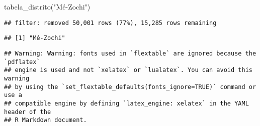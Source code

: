 \documentclass[
]{article}
\newenvironment{Shaded}{\begin{snugshade}}{\end{snugshade}}
\newcommand{\FunctionTok}[1]{\textcolor[rgb]{0.00,0.00,0.00}{#1}}
\newcommand{\NormalTok}[1]{#1}
\newcommand{\StringTok}[1]{\textcolor[rgb]{0.31,0.60,0.02}{#1}}
\begin{document}
\begin{Shaded}
\begin{Highlighting}[]
\FunctionTok{tabela\_distrito}\NormalTok{(}\StringTok{"Mé{-}Zochi"}\NormalTok{)}
\end{Highlighting}
\end{Shaded}

\begin{verbatim}
## filter: removed 50,001 rows (77%), 15,285 rows remaining
\end{verbatim}

\begin{verbatim}
## [1] "Mé-Zochi"
\end{verbatim}

\begin{verbatim}
## Warning: Warning: fonts used in `flextable` are ignored because the `pdflatex`
## engine is used and not `xelatex` or `lualatex`. You can avoid this warning
## by using the `set_flextable_defaults(fonts_ignore=TRUE)` command or use a
## compatible engine by defining `latex_engine: xelatex` in the YAML header of the
## R Markdown document.
\end{verbatim}

\providecommand{\docline}[3]{\noalign{\global\setlength{\arrayrulewidth}{#1}}\arrayrulecolor[HTML]{#2}\cline{#3}}

\setlength{\tabcolsep}{2pt}

\renewcommand*{\arraystretch}{1.5}
\end{document}
